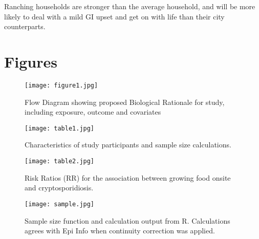 \documentclass[12pt]{article}
\begin{document}
		Ranching households are stronger than the average household, and will be more likely to deal with a mild GI upset and get on with life than their city counterparts. 
		\clearpage
		
	\section{Figures}

\begin{figure*}[h!]
	\centering
	\texttt{[image: figure1.jpg]}
	\caption{Flow Diagram showing proposed Biological Rationale for study, including exposure, outcome and covariates }
	\label{figure1}
\end{figure*}

\begin{figure*}[h!]
	\centering
	\texttt{[image: table1.jpg]}
	\caption{Characteristics of study participants and sample size calculations.}
	\label{table1}
\end{figure*}
 
\begin{figure*}[h!]
	\centering
	\texttt{[image: table2.jpg]}
	\caption{Risk Ratios (RR) for the association between growing food onsite and cryptosporidiosis.}
	\label{table2}
\end{figure*}

\begin{figure*}[h!]
	\centering
	\texttt{[image: sample.jpg]}
	\caption{Sample size function and calculation output from R. Calculations agrees with Epi Info when continuity correction was applied.}
	\label{sample}
\end{figure*}

\clearpage


\end{document}
